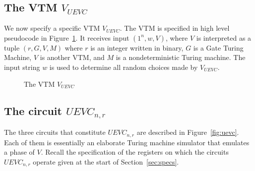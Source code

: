 \documentclass[11pt,letterpaper]{article}
\begin{document}
\subsection{The VTM $V_{UEVC}$}
\label{sec:vtm-lambda}

We now specify a specific VTM $V_{UEVC}$. The VTM is specified in high level pseudocode in Figure~\ref{fig:lambda}. It receives input $(1^n,w,V)$, where $V$ is interpreted as a tuple $(r,G,V,M)$ where $r$ is an integer written in binary, $G$ is a Gate Turing Machine, $V$ is another VTM, and $M$ is a nondeterministic Turing machine. The input string $w$ is used to determine all random choices made by $V_{UEVC}$.

\begin{figure}[H]
\begin{center}

\end{center}
\caption{The VTM $V_{UEVC}$}
\label{fig:lambda}
\end{figure}

\subsection{The circuit $UEVC_{n,r}$}

The three circuits that constitute $UEVC_{n,r}$ are described in Figure~\ref{fig:uevc}. Each of them is essentially an elaborate Turing machine simulator that emulates a phase of $V$. Recall the specification of the registers on which the circuits $UEVC_{n,r}$ operate given at the start of Section~\ref{sec:specs}. 
\end{document}
